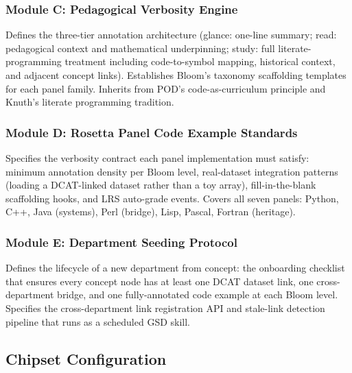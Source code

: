 \documentclass[11pt,letterpaper]{article}
\begin{document}
\subsubsection{Module C: Pedagogical Verbosity Engine}
Defines the three-tier annotation architecture (glance: one-line summary; read: pedagogical context and mathematical underpinning; study: full literate-programming treatment including code-to-symbol mapping, historical context, and adjacent concept links). Establishes Bloom's taxonomy scaffolding templates for each panel family. Inherits from POD's code-as-curriculum principle and Knuth's literate programming tradition.

\subsubsection{Module D: Rosetta Panel Code Example Standards}
Specifies the verbosity contract each panel implementation must satisfy: minimum annotation density per Bloom level, real-dataset integration patterns (loading a DCAT-linked dataset rather than a toy array), fill-in-the-blank scaffolding hooks, and LRS auto-grade events. Covers all seven panels: Python, C++, Java (systems), Perl (bridge), Lisp, Pascal, Fortran (heritage).

\subsubsection{Module E: Department Seeding Protocol}
Defines the lifecycle of a new department from concept: the onboarding checklist that ensures every concept node has at least one DCAT dataset link, one cross-department bridge, and one fully-annotated code example at each Bloom level. Specifies the cross-department link registration API and stale-link detection pipeline that runs as a scheduled GSD skill.

\subsection{Chipset Configuration}
\end{document}
